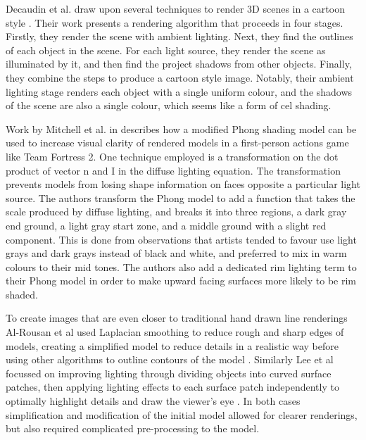 Decaudin et al. draw upon several techniques to render 3D scenes in a cartoon style 
\cite{decaudin96}. Their work presents a rendering algorithm that proceeds in four stages. 
Firstly, they render the scene with ambient lighting. Next, they find the outlines of each 
object in the scene. For each light source, they render the scene as illuminated by it, and 
then find the project shadows from other objects. Finally, they combine the steps to produce 
a cartoon style image. Notably, their ambient lighting stage renders each object with a 
single uniform colour, and the shadows of the scene are also a single colour, which seems 
like a form of cel shading.

\cite{gooch98}
Work by Mitchell et al. in \cite{mitchell07} describes how a modified Phong shading model can
be used to increase visual clarity of rendered models in a first-person actions game like Team
Fortress 2. One technique employed is a transformation on the dot product of vector n and I in 
the diffuse lighting equation. The transformation prevents models from losing shape information
on faces opposite a particular light source. The authors transform the Phong model
to add a function that takes the scale produced by diffuse lighting, and breaks it into three 
regions, a dark gray end ground, a light gray start zone, and a middle ground with a slight 
red component. This is done from observations that artists tended to favour use light grays and
dark grays instead of black and white, and preferred to mix in warm colours to their mid tones. 
The authors also add a dedicated rim lighting term to their Phong model in order to make upward
facing surfaces more likely to be rim shaded.

To create images that are even closer to traditional hand drawn line renderings Al-Rousan et al used Laplacian smoothing to reduce rough and sharp edges of models, creating a simplified model to reduce details in a realistic way before using other algorithms to outline contours of the model \cite{riyad16}. Similarly Lee et al focussed on improving lighting through dividing objects into curved surface patches, then applying lighting effects to each surface patch independently to optimally highlight details and draw the viewer's eye \cite{lee06}. In both cases simplification and modification of the initial model allowed for clearer renderings, but also required complicated pre-processing to the model.